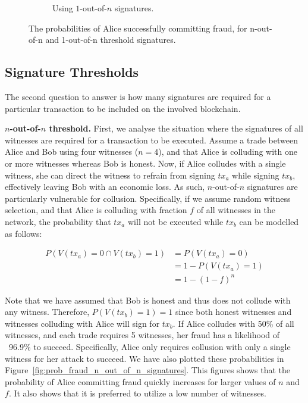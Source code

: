 \documentclass{article}
\begin{document}
\begin{figure}[t]
\begin{subfigure}[t]{.5\textwidth}
               \caption{Using $1$-out-of-$n$ signatures.}
               \label{fig:prob_fraud_1_out_of_n_signatures}
       \end{subfigure}%
       \caption{The probabilities of Alice successfully committing fraud, for n-out-of-n and 1-out-of-n threshold signatures.}
       \label{fig:prob_fraud_signatures}
\end{figure}

\subsection{Signature Thresholds}
The second question to answer is how many signatures are required for a particular transaction to be included on the involved blockchain.

\textbf{$n$-out-of-$n$ threshold.}
First, we analyse the situation where the signatures of all witnesses are required for a transaction to be executed.
Assume a trade between Alice and Bob using four witnesses ($ n = 4 $), and that Alice is colluding with one or more witnesses whereas Bob is honest.
Now, if Alice colludes with a single witness, she can direct the witness to refrain from signing $ tx_a $ while signing $ tx_b $, effectively leaving Bob with an economic loss.
As such, $n$-out-of-$n$ signatures are particularly vulnerable for collusion.
Specifically, if we assume random witness selection, and that Alice is colluding with fraction $ f $ of all witnesses in the network, the probability that $ tx_a $ will not be executed while $ tx_b $ can be modelled as follows:

\begin{equation}
	\begin{aligned}
	P(V(tx_a) = 0 \cap V(tx_b) = 1) & = P(V(tx_a) = 0)\\
	& = 1 - P(V(tx_a) = 1)\\
	& = 1 - (1 - f)^n
	\end{aligned}
\end{equation}

Note that we have assumed that Bob is honest and thus does not collude with any witness.
Therefore, $ P(V(tx_b) = 1) = 1 $ since both honest witnesses and witnesses colluding with Alice will sign for $ tx_b $.
If Alice colludes with 50\% of all witnesses, and each trade requires 5 witnesses, her fraud has a likelihood of ~96.9\% to succeed.
Specifically, Alice only requires collusion with only a single witness for her attack to succeed.
We have also plotted these probabilities in Figure~\ref{fig:prob_fraud_n_out_of_n_signatures}.
This figures shows that the probability of Alice committing fraud quickly increases for larger values of $ n $ and $ f $.
It also shows that it is preferred to utilize a low number of witnesses.
\end{document}
